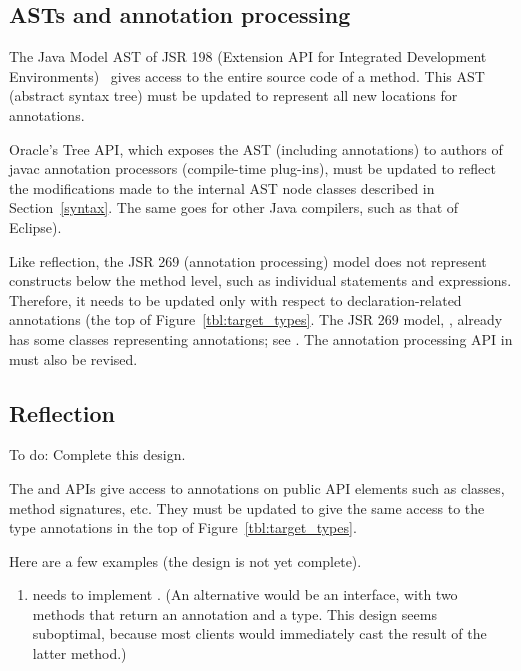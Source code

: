 \documentclass[10pt]{article}
\begin{document}
\subsection{ASTs and annotation processing\label{asts-and-annotation-processing}}

The Java Model AST of JSR 198 (Extension API for Integrated Development
Environments)~\cite{JSR198} gives access to the entire source code of a
method.  This AST (abstract syntax tree) must be updated to represent all
new locations for annotations.

Oracle's Tree API, which exposes the AST (including annotations) to authors of
javac annotation processors (compile-time plug-ins), must be updated to
reflect the modifications made to the internal AST node classes described in
Section~\ref{syntax}.
The same goes for other Java compilers, such as that of Eclipse).


\label{jsr269-changes}

Like reflection, the JSR 269 (annotation processing) model
does not represent constructs below the
method level, such as individual statements and expressions.  Therefore, it
needs to be updated only with respect to declaration-related annotations
(the top of Figure~\ref{tbl:target_types}.
The JSR 269 model, ,
already has some classes representing annotations; see
.
The annotation processing API in  must
also be revised.




\subsection{Reflection\label{reflection}}

To do:  Complete this design.

The  and  APIs give access
to annotations on public API elements such as classes,
method signatures, etc.  They must be updated to give the same
access to the type annotations in the top of
Figure~\ref{tbl:target_types}.

Here are a few examples (the design is not yet complete).

\begin{enumerate}
\item
{} needs to implement
.
(An alternative would be an 
interface, with two methods that return an annotation and a type.  This
design seems suboptimal, because most
clients would immediately cast the result of the latter method.)

\end{enumerate}
\end{document}
